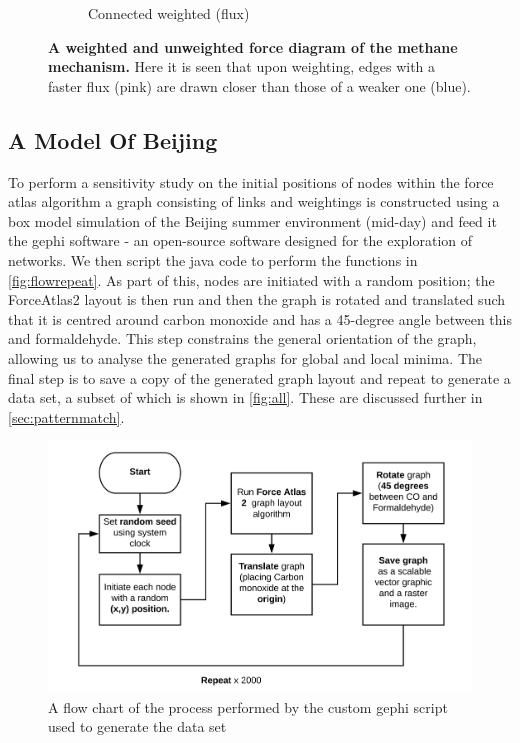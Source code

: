 \begin{figure}[H]
\begin{subfigure}[b]{.4\textwidth}
     \caption{Connected weighted (flux)}
     \end{subfigure}
        \caption{\textbf{A weighted and unweighted force diagram of the methane mechanism.} Here it is seen that upon weighting, edges with a faster flux (pink) are drawn closer than those of a weaker one (blue).}
      \label{fig:resmeth}
\end{figure}


\subsection{A Model Of Beijing}
To perform a sensitivity study on the initial positions of nodes within the force atlas algorithm a graph consisting of links and weightings is constructed using a box model simulation of the Beijing summer environment (mid-day) and feed it the gephi software \citep{gephi} - an open-source software designed for the exploration of networks. We then script the java code to perform the functions in \autoref{fig:flowrepeat}. As part of this, nodes are initiated with a random position; the ForceAtlas2 layout is then run and then the graph is rotated and translated such that it is centred around carbon monoxide and has a 45-degree angle between this and formaldehyde. This step constrains the general orientation of the graph, allowing us to analyse the generated graphs for global and local minima. The final step is to save a copy of the generated graph layout and repeat to generate a data set, a subset of which is shown in  \autoref{fig:all}. These are discussed further in \autoref{sec:patternmatch}.

    \begin{figure}[H]
         \centering
     \includegraphics[width=\textwidth]{figures_c1/flowrepeat.png}
     \caption{ A flow chart of the process performed by the custom gephi script used to generate the data set}
     \label{fig:flowrepeat}
     \end{figure}

